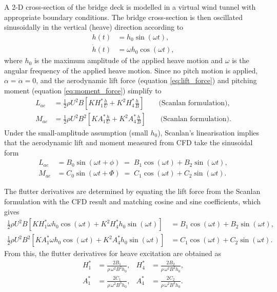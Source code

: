 \documentclass[../main]{subfiles}
\begin{document}
A 2-D cross-section of the bridge deck is modelled in a virtual wind tunnel with appropriate boundary conditions. The bridge cross-section is then oscillated 
sinusoidally in the vertical (heave) direction according to
\begin{align}
    h(t)       &= h_0 \sin(\omega t), \\
    \dot{h}(t) &= \omega h_0 \cos(\omega t),
\end{align}
where \(h_0\) is the maximum amplitude of the applied heave motion and \(\omega\) is the angular frequency of the applied heave motion. 
Since no pitch motion is applied, \(\alpha = \dot{\alpha} = 0\), and the aerodynamic lift force (equation \ref{eq:lift_force}) and pitching moment (equation \ref{eq:moment_force}) simplify to
\begin{align}
    L_{ae} &= \frac{1}{2}\rho U^2 B
              \left[KH_1^*\frac{\dot{h}}{U} + K^2H_4^*\frac{h}{B}\right]
              \qquad \text{(Scanlan formulation)}, \\[4pt]
    M_{ae} &= \frac{1}{2}\rho U^2 B^2
              \left[KA_1^*\frac{\dot{h}}{U} + K^2A_4^*\frac{h}{B}\right]
              \qquad \text{(Scanlan formulation)}.
\end{align}
Under the small-amplitude assumption (small \(h_0\)), Scanlan's linearisation implies that the aerodynamic lift and moment 
measured from CFD take the sinusoidal form
\begin{align}
    L_{ae} &= B_0 \sin(\omega t + \phi)
           \;=\; B_1 \cos(\omega t) + B_2 \sin(\omega t), \\[4pt]
    M_{ae} &= C_0 \sin(\omega t + \Phi)
           \;=\; C_1 \cos(\omega t) + C_2 \sin(\omega t).
\end{align}

The flutter derivatives are determined by equating the lift force from the Scanlan formulation with the CFD result and 
matching cosine and sine coefficients, which gives
\begin{align}
    \frac{1}{2}\rho U^2 B
    \left[KH_1^* \omega h_0 \cos(\omega t) + K^2H_4^* h_0 \sin(\omega t)\right]
    &= B_1 \cos(\omega t) + B_2 \sin(\omega t), \\[4pt]
    \frac{1}{2}\rho U^2 B^2
    \left[KA_1^* \omega h_0 \cos(\omega t) + K^2A_4^* h_0 \sin(\omega t)\right]
    &= C_1 \cos(\omega t) + C_2 \sin(\omega t).
\end{align}
From this, the flutter derivatives for heave excitation are obtained as
\begin{align}
    H_1^* &= \frac{2B_1}{\rho\,\omega^2 B^2 h_0}, &
    H_4^* &= \frac{2B_2}{\rho\,\omega^2 B^2 h_0}, \\[4pt]
    A_1^* &= \frac{2C_1}{\rho\,\omega^2 B^3 h_0}, &
    A_4^* &= \frac{2C_2}{\rho\,\omega^2 B^3 h_0}.
\end{align}
\end{document}
